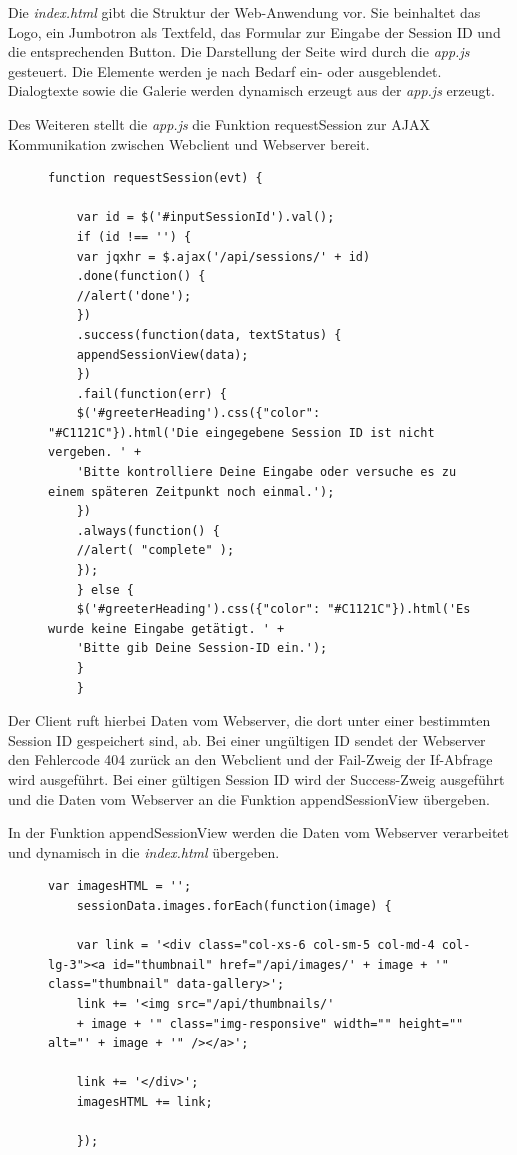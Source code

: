 Die \textit{index.html} gibt die Struktur der Web-Anwendung vor. Sie beinhaltet das Logo, ein Jumbotron als Textfeld, das Formular zur Eingabe der Session ID und die entsprechenden Button.  Die Darstellung der Seite wird durch die \textit{app.js} gesteuert. Die Elemente werden je nach Bedarf ein- oder ausgeblendet. Dialogtexte sowie die Galerie werden dynamisch erzeugt aus der \textit{app.js} erzeugt. 

Des Weiteren stellt die \textit{app.js} die Funktion requestSession zur AJAX Kommunikation zwischen Webclient und Webserver bereit.

\begin{figure}[h]
	\begin{lstlisting}[caption={Auszug aus app.js}, label=list_client]
	function requestSession(evt) {
	
	var id = $('#inputSessionId').val();
	if (id !== '') {
	var jqxhr = $.ajax('/api/sessions/' + id)
	.done(function() {
	//alert('done');
	})
	.success(function(data, textStatus) {
	appendSessionView(data);
	})
	.fail(function(err) {
	$('#greeterHeading').css({"color": "#C1121C"}).html('Die eingegebene Session ID ist nicht vergeben. ' +
	'Bitte kontrolliere Deine Eingabe oder versuche es zu einem späteren Zeitpunkt noch einmal.');
	})
	.always(function() {
	//alert( "complete" );
	});
	} else {
	$('#greeterHeading').css({"color": "#C1121C"}).html('Es wurde keine Eingabe getätigt. ' +
	'Bitte gib Deine Session-ID ein.');
	}
	}
	\end{lstlisting}
\end{figure}

Der Client ruft hierbei Daten vom Webserver, die dort unter einer bestimmten Session ID gespeichert sind, ab. Bei einer ungültigen ID sendet der Webserver den Fehlercode 404 zurück an den Webclient und der Fail-Zweig der If-Abfrage wird ausgeführt. Bei einer gültigen Session ID wird der Success-Zweig ausgeführt und die Daten vom Webserver an die Funktion appendSessionView übergeben.

In der Funktion appendSessionView werden die Daten vom Webserver verarbeitet und dynamisch in die \textit{index.html} übergeben.

\begin{figure}[h]
	\begin{lstlisting}[caption={Auszug aus app.js}, label=list_client]
	var imagesHTML = '';
	sessionData.images.forEach(function(image) {
	
	var link = '<div class="col-xs-6 col-sm-5 col-md-4 col-lg-3"><a id="thumbnail" href="/api/images/' + image + '" class="thumbnail" data-gallery>';
	link += '<img src="/api/thumbnails/'
	+ image + '" class="img-responsive" width="" height="" alt="' + image + '" /></a>';
	
	link += '</div>';
	imagesHTML += link;
	
	});
	\end{lstlisting}
\end{figure}

